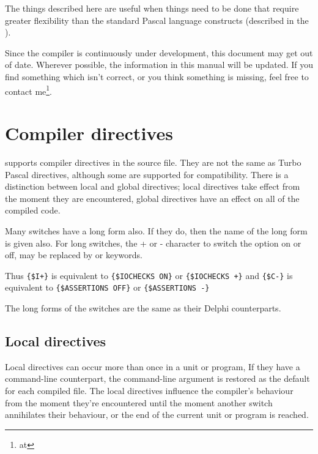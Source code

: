 The things described here are useful when things need to be done that
require greater flexibility than the standard Pascal language constructs
(described in the ).

Since the compiler is continuously under development, this document may get
out of date. Wherever possible, the information in this manual will be
updated. If you find something which isn't correct, or you think something
 is missing, feel free to contact me\footnote{at
}.

\chapter{Compiler directives}
\label{ch:CompSwitch}

\fpc supports compiler directives in the source file. They are not the same
as Turbo Pascal directives, although some are supported for compatibility.
There is a distinction between local and global directives; local directives
take effect from the moment they are encountered, global directives have an
effect on all of the compiled code.

Many switches have a long form also. If they do, then the name of the
long form is given also. For long switches, the + or - character to switch
the option on or off, may be replaced by  or  keywords.

Thus \verb|{$I+}| is equivalent to \verb|{$IOCHECKS ON}| or
\verb|{$IOCHECKS +}| and
\verb|{$C-}| is equivalent to \verb|{$ASSERTIONS OFF}| or
\verb|{$ASSERTIONS -}|

The long forms of the switches are the same as their Delphi
counterparts.

\section{Local directives}
\label{se:LocalSwitch}
Local directives can occur more than once in a unit or program,
If they have a command-line counterpart, the command-line argument is
restored as the default for each compiled file. The local directives
influence the compiler's behaviour from the moment they're encountered
until the moment another switch annihilates their behaviour, or the end
of the current unit or program is reached.

